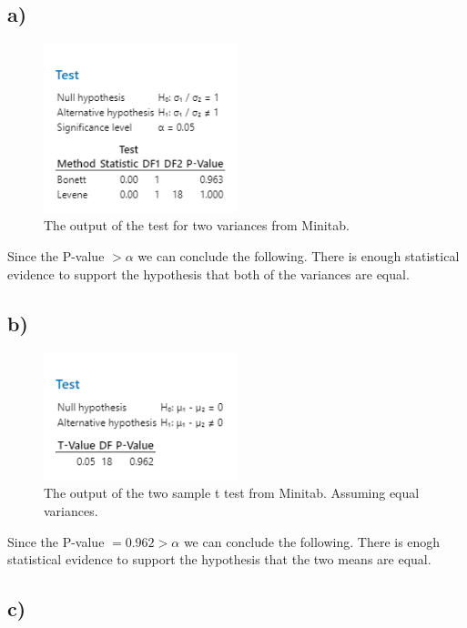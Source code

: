 \documentclass{article}
\begin{document}
\subsection*{a)}
\begin{figure}[h]
    \centering
    \includegraphics[width=0.5\textwidth]{./images/3_a.png}
    \caption{The output of the test for two variances from Minitab.}
    \label{fig:3_a}
  \end{figure}
  Since the P-value $> \alpha$ we can conclude the following. There is enough statistical evidence to support the hypothesis that both of the variances are equal.

\subsection*{b)}
\begin{figure}[h]
    \centering
    \includegraphics[width=0.5\textwidth]{./images/3_b.png}
    \caption{The output of the two sample t test from Minitab. Assuming equal variances.}
    \label{fig:3_a}
  \end{figure}
  Since the P-value $= 0.962 > \alpha$ we can conclude the following. There is enogh statistical evidence to support the hypothesis that the two means are equal.
\subsection*{c)}
\end{document}
